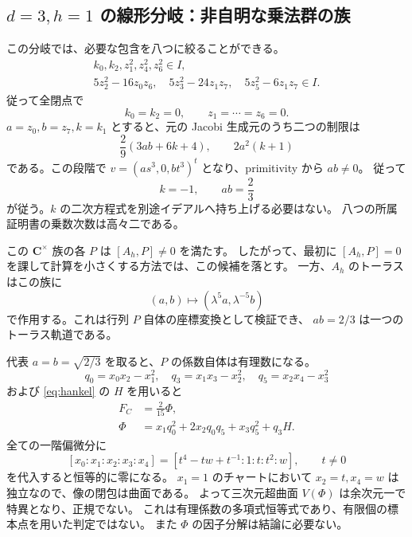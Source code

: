 \documentclass[11pt,a4paper]{ltjsarticle}
\newcommand{\CC}{\mathbf C}\newcommand{\QQ}{\mathbf Q}
\theoremstyle{remark}\newtheorem{remark}[theorem]{注意}
\begin{document}
\subsection{\texorpdfstring{$d=3,h=1$}{d=3, h=1} の線形分岐：非自明な乗法群の族}

この分岐では、必要な包含を八つに絞ることができる。
\begin{equation}\label{eq:h-eight}
\begin{gathered}
 k_0,k_2,z_1^2,z_4^2,z_6^2\in I,\\
 5z_2^2-16z_0z_6,\quad
 5z_3^2-24z_1z_7,\quad
 5z_5^2-6z_1z_7\in I.
\end{gathered}
\end{equation}
従って全閉点で
\[
                         k_0=k_2=0,\qquad z_1=\cdots=z_6=0.
\]
$a=z_0,b=z_7,k=k_1$ とすると、元の Jacobi 生成元のうち二つの制限は
\begin{equation}\label{eq:h-original-two}
               \frac29(3ab+6k+4),\qquad 2a^2(k+1)
\end{equation}
である。この段階で $v=(as^3,0,bt^3)^t$ となり、primitivity から $ab\ne0$。
従って
\begin{equation}\label{eq:h-cstar}
                          k=-1,\qquad ab=\frac23
\end{equation}
が従う。$k$ の二次方程式を別途イデアルへ持ち上げる必要はない。
八つの所属証明書の乗数次数は高々二である。

この $\CC^\times$ 族の各 $P$ は $[A_h,P]\ne0$ を満たす。
したがって、最初に $[A_h,P]=0$ を課して計算を小さくする方法では、この候補を落とす。
一方、$A_h$ のトーラスはこの族に
\[
                  (a,b)\longmapsto(\lambda^5a,\lambda^{-5}b)
\]
で作用する。これは行列 $P$ 自体の座標変換として検証でき、
$ab=2/3$ は一つのトーラス軌道である。

代表 $a=b=\sqrt{2/3}$ を取ると、$P$ の係数自体は有理数になる。
\[
 q_0=x_0x_2-x_1^2,\quad q_3=x_1x_3-x_2^2,\quad q_5=x_2x_4-x_3^2
\]
および \eqref{eq:hankel} の $H$ を用いると
\begin{equation}\label{eq:h-phi}
\begin{split}
 F_C&=\frac2{15}\Phi,\\
 \Phi&=x_1q_0^2+2x_2q_0q_5+x_3q_5^2+q_3H.
\end{split}
\end{equation}
全ての一階偏微分に
\begin{equation}\label{eq:h-surface}
 [x_0:x_1:x_2:x_3:x_4]
 =[t^4-tw+t^{-1}:1:t:t^2:w],\qquad t\ne0
\end{equation}
を代入すると恒等的に零になる。
$x_1=1$ のチャートにおいて $x_2=t,x_4=w$ は独立なので、像の閉包は曲面である。
よって三次元超曲面 $V(\Phi)$ は余次元一で特異となり、正規でない。
これは有理係数の多項式恒等式であり、有限個の標本点を用いた判定ではない。
また $\Phi$ の因子分解は結論に必要ない。
\end{document}
